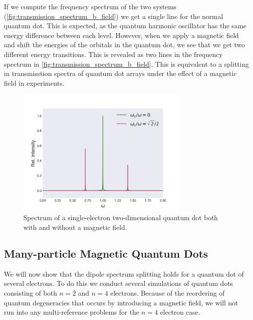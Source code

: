 If we compute the frequency spectrum of the two systems
(\autoref{fig:transmission_spectrum_b_field}) we get a single line for the 
normal quantum dot. This is expected, as the quantum harmonic oscillator has 
the same energy difference between each level. However, when we apply a magnetic
field and shift the energies of the orbitals in the quantum dot, we see that we 
get two different energy transitions. This is revealed as two lines in the 
frequency spectrum in \autoref{fig:transmission_spectrum_b_field}. This is equivalent 
to a splitting in transmisstion spectra of quantum dot arrays under the effect 
of a magnetic field in experiments\cite{heitmann1993spectroscopy,meurer1992single}.

\begin{figure}
    \centering
    \includegraphics[width=0.75\textwidth]{results/figures/transmission_spectrum.png}
    \caption{Spectrum of a single-electron two-dimensional quantum dot both with and
        without a magnetic field.
    }
    \label{fig:transmission_spectrum_b_field}
\end{figure}

\subsection{Many-particle Magnetic Quantum Dots}

We will now show that the dipole spectrum splitting holds for a quantum dot of 
several electrons. To do this we conduct several simulations of quantum dots consisting 
of both $n=2$ and $n=4$ electrons. Because of the reordering of quantum degeneracies 
that occurs by introducing a magnetic field, we will not run into any multi-reference 
problems for the $n=4$ electron case.

